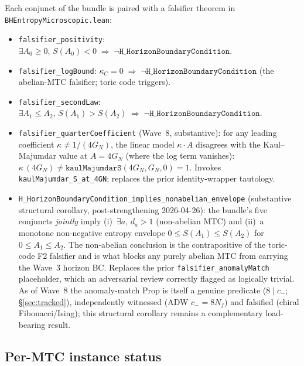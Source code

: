 \documentclass[aps,prd,twocolumn,showpacs,superscriptaddress,nofootinbib]{revtex4-2}
\begin{document}
Each conjunct of the bundle is paired with a falsifier theorem in
\texttt{BHEntropyMicroscopic.lean}:
\begin{itemize}
  \item \texttt{falsifier\_positivity}: $\exists A_0 \geq 0,\,
        S(A_0) < 0 \;\Rightarrow\; \neg \texttt{H\_HorizonBoundaryCondition}$.
  \item \texttt{falsifier\_logBound}: $\kappa_C = 0 \;\Rightarrow\;
        \neg \texttt{H\_HorizonBoundaryCondition}$ (the abelian-MTC
        falsifier; toric code triggers).
  \item \texttt{falsifier\_secondLaw}: $\exists A_1 \leq A_2,\,
        S(A_1) > S(A_2) \;\Rightarrow\; \neg \texttt{H\_HorizonBoundaryCondition}$.
  \item \texttt{falsifier\_quarterCoefficient} (Wave~8, substantive): for any
        leading coefficient $\kappa \neq 1/(4 G_N)$, the linear model
        $\kappa\!\cdot\!A$ disagrees with the Kaul--Majumdar value at $A = 4 G_N$
        (where the log term vanishes): $\kappa\,(4 G_N) \neq
        \texttt{kaulMajumdarS}(4 G_N, G_N, 0) = 1$. Invokes
        \texttt{kaulMajumdar\_S\_at\_4GN}; replaces the prior identity-wrapper
        tautology.
  \item \texttt{H\_HorizonBoundaryCondition\_implies\_nonabelian\_envelope}
        (substantive structural corollary, post-strengthening 2026-04-26):
        the bundle's five conjuncts \emph{jointly} imply (i)~$\exists a,\,
        d_a > 1$ (non-abelian MTC) and (ii)~a monotone non-negative
        entropy envelope $0 \leq S(A_1) \leq S(A_2)$ for $0 \leq A_1
        \leq A_2$. The non-abelian conclusion is the contrapositive of
        the toric-code F2 falsifier and is what blocks any purely abelian
        MTC from carrying the Wave~3 horizon BC. Replaces the prior
        \texttt{falsifier\_anomalyMatch} placeholder, which an
        adversarial review correctly flagged as logically trivial. As of
        Wave~8 the anomaly-match Prop is itself a genuine predicate
        ($8 \mid c_-$; \S\ref{sec:tracked}), independently witnessed (ADW
        $c_- = 8 N_f$) and falsified (chiral Fibonacci/Ising); this
        structural corollary remains a complementary load-bearing result.
\end{itemize}

\subsection{Per-MTC instance status}
\label{sec:instances}
\end{document}
